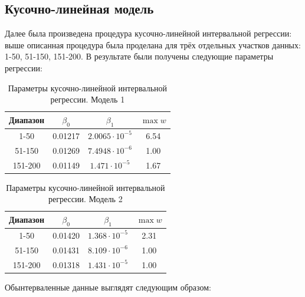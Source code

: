 \subsection{Кусочно-линейная модель}

Далее была произведена процедура кусочно-линейной интервальной регрессии: выше описанная процедура была проделана для трёх отдельных участков данных: 1-50, 51-150, 151-200. В результате были получены следующие параметры регрессии:

\begin{table}[H]
	\begin{center}
		\begin{tabular}{|c|c|c|c|}
			\hline
			Диапазон & $\beta_0$ & $\beta_1$ & $\max w$ \\
			\hline
			1-50 & 0.01217 & $2.0065 \cdot 10^{-5}$ & 6.54 \\
			\hline
			51-150 & 0.01269 & $7.4948 \cdot 10^{-6}$ & 1.00 \\
			\hline
			151-200 & 0.01149 & $1.471 \cdot 10^{-5}$ & 1.67 \\
			\hline
		\end{tabular}
		\caption{Параметры кусочно-линейной интервальной регрессии. Модель 1}
	\end{center}
\end{table}

\begin{table}[H]
	\begin{center}
		\begin{tabular}{|c|c|c|c|}
			\hline
			Диапазон & $\beta_0$ & $\beta_1$ & $\max w$ \\
			\hline
			1-50 & 0.01420 & $1.368 \cdot 10^{-5}$ & 2.31 \\
			\hline
			51-150 & 0.01431 & $8.109 \cdot 10^{-6}$ & 1.00 \\
			\hline
			151-200 & 0.01318 & $1.431 \cdot 10^{-5}$ & 1.00 \\
			\hline
		\end{tabular}
		\caption{Параметры кусочно-линейной интервальной регрессии. Модель 2}
	\end{center}
\end{table}

Обынтерваленные данные выглядят следующим образом:

